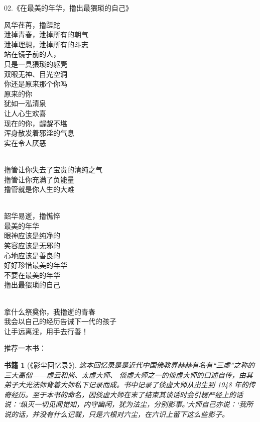 \documentclass{ctexart}
\newtheorem{book}{书籍}
\begin{document}
\begin{center}
    02.《在最美的年华，撸出最猥琐的自己》\it
    \begin{multicols}{2}
        风华荏苒，撸蹉跎 \\ 泄掉青春，泄掉所有的朝气 \\ 泄掉理想，泄掉所有的斗志 \\ 站在镜子前的人， \\ 只是一具猥琐的躯壳 \\ 双眼无神、目光空洞 \\ 你还是原来那个你吗 \\ 原来的你 \\ 犹如一泓清泉 \\ 让人心生欢喜 \\ 现在的你，龌龊不堪 \\ 浑身散发着邪淫的气息 \\ 实在令人厌恶

        ~\\

        撸管让你失去了宝贵的清纯之气 \\ 撸管让你充满了负能量 \\ 撸管就是你人生的大难

        ~\\

        韶华易逝，撸憔悴 \\ 最美的年华 \\ 眼神应该是纯净的 \\ 笑容应该是无邪的 \\ 心地应该是善良的 \\ 好好珍惜最美的年华 \\ 不要在最美的年华 \\ 撸出最猥琐的自己

        ~\\

        拿什么祭奠你，我撸逝的青春 \\ 我会以自己的经历告诫下一代的孩子 \\ 让手远离淫，用手去行善！
    \end{multicols}
\end{center}

推荐一本书：

\begin{book}[《影尘回忆录》]
    这本回忆录是是近代中国佛教界赫赫有名有“三虚”之称的三大高僧——虚云和尚、太虚大师、 倓虚大师之一的倓虚大师的口述自传，由其弟子大光法师背着大师私下记录而成。书中记录了倓虚大师从出生到 1948 年的传奇经历。至于本书的命名，因倓虚大师在末了结束其谈话时会引楞严经上的话说：‘纵灭一切见闻觉知，内守幽闲，犹为法尘，分别影事。’大师自己亦说：‘我所说的话，并没有什么记载，只是六根对六尘，在六识上留下这么些影子。
\end{book}
\end{document}
